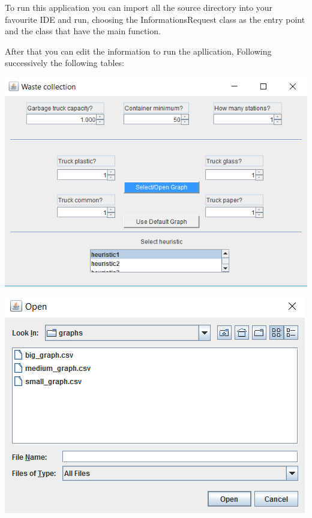 \documentclass[a4paper]{article}
\begin{document}
To run this application you can import all the source directory into your favourite IDE and run, choosing the InformationsRequest class as the entry point and the class that have the main function.

After that you can edit the information to run the apllication, Following successively the following tables:

\begin{center}
\centering \includegraphics[scale=0.75]{table1.png}	
\end{center}

\begin{center}
\centering \includegraphics[scale=0.75]{table2.png}
\end{center}
\end{document}
